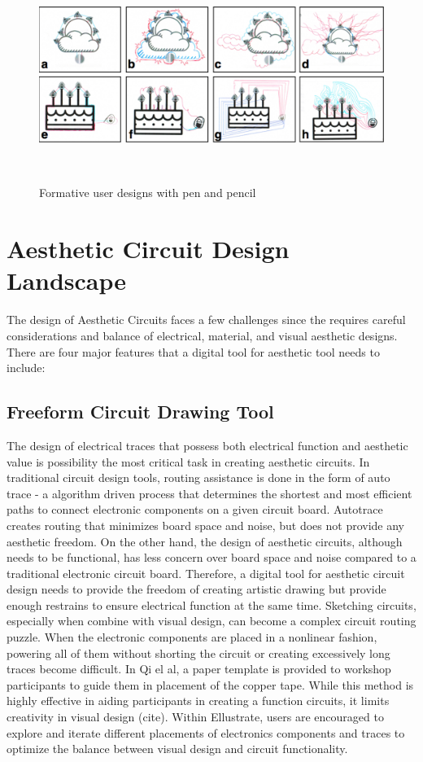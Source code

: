 \documentclass{sigchi}
\begin{document}
\begin{figure}
\centering
  \includegraphics[width=1\columnwidth]{figures/Ellustrate_figures_formative_user_design}
  \caption{Formative user designs with pen and pencil}~\label{fig:formative_user_design}
  \vspace{-16pt}
\end{figure}

\section{Aesthetic Circuit Design Landscape}
The design of Aesthetic Circuits faces a few challenges since the requires careful considerations and balance of electrical, material, and visual aesthetic designs. There are four major features that a digital tool for aesthetic tool needs to include: 
\subsection{Freeform Circuit Drawing Tool}
The design of electrical traces that possess both electrical function and aesthetic value is possibility the most critical task in creating aesthetic circuits. In traditional circuit design tools, routing assistance is done in the form of auto trace - a algorithm driven process that determines the shortest and most efficient paths to connect electronic components on a given circuit board. Autotrace creates routing that minimizes board space and noise, but does not provide any aesthetic freedom. On the other hand, the design of aesthetic circuits, although needs to be functional, has less concern over board space and noise compared to a traditional electronic circuit board. Therefore, a digital tool for aesthetic circuit design needs to provide the freedom of creating artistic drawing but provide enough restrains to ensure electrical function at the same time.  Sketching circuits, especially when combine with visual design, can become a complex circuit routing puzzle. When the electronic components are placed in a nonlinear fashion, powering all of them without shorting the circuit or creating excessively long traces become difficult. In Qi el al, a paper template is provided to workshop participants to guide them in placement of the copper tape. While this method is highly effective in aiding participants in creating a function circuits, it limits creativity in visual design (cite).  Within Ellustrate, users are encouraged to explore and iterate different placements of electronics components and traces to optimize the balance between visual design and circuit functionality.
\end{document}
